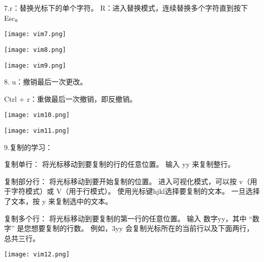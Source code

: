\documentclass{article}
\begin{document}
7.r：替换光标下的单个字符。
R：进入替换模式，连续替换多个字符直到按下 Esc。


\noindent
\begin{minipage}{\linewidth}
 \centering
  \texttt{[image: vim7.png]}
  \label{fig:example}
\end{minipage}

\noindent
\begin{minipage}{\linewidth}
 \centering
  \texttt{[image: vim8.png]}
  \label{fig:example}
\end{minipage}

\noindent
\begin{minipage}{\linewidth}
 \centering
  \texttt{[image: vim9.png]}
  \label{fig:example}
\end{minipage}

8. 
u：撤销最后一次更改。

Ctrl + r：重做最后一次撤销，即反撤销。


\begin{minipage}{\linewidth}
    \centering
     \texttt{[image: vim10.png]}
     \label{fig:example}
\end{minipage}

\begin{minipage}{\linewidth}
  \centering
   \texttt{[image: vim11.png]}
   \label{fig:example}
\end{minipage}


9.复制的学习：

复制单行：
将光标移动到要复制的行的任意位置。
输入 yy 来复制整行。

复制部分行：
将光标移动到要开始复制的位置。
进入可视化模式，可以按 v（用于字符模式）或 V（用于行模式）。
使用光标键hjkl选择要复制的文本。
一旦选择了文本，按 y 来复制选中的文本。

复制多个行：
将光标移动到要复制的第一行的任意位置。
输入 数字yy，其中 “数字” 是您想要复制的行数。
例如，3yy 会复制光标所在的当前行以及下面两行，总共三行。

\noindent
\begin{minipage}{\linewidth}
 \centering
  \texttt{[image: vim12.png]}
  \label{fig:example}
\end{minipage}
\end{document}
